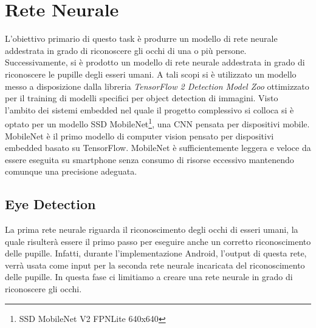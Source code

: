 \documentclass[11pt]{article}
\begin{document}
\newpage

\section{Rete Neurale}
\label{sec:ret}
L’obiettivo primario di questo task è produrre un modello di rete neurale addestrata in grado di riconoscere gli occhi di una o più persone. Successivamente, si è prodotto un modello di rete neurale addestrata in grado di riconoscere le pupille degli esseri umani.
\newline
A tali scopi si è utilizzato un modello messo a disposizione dalla libreria \textit{TensorFlow 2 Detection Model Zoo} ottimizzato per il training di modelli specifici per object detection di immagini. Visto l’ambito dei sistemi embedded nel quale il progetto complessivo si colloca si è optato per un modello SSD MobileNet\footnote{SSD MobileNet V2 FPNLite 640x640}, una CNN pensata per dispositivi mobile. MobileNet è il primo modello di computer vision pensato per dispositivi embedded basato su TensorFlow. MobileNet è sufficientemente leggera e veloce da essere eseguita su smartphone senza consumo di risorse eccessivo mantenendo comunque una precisione adeguata.

\newpage

\subsection{Eye Detection}
\label{sub:eye}
La prima rete neurale riguarda il riconoscimento degli occhi di esseri umani, la quale risulterà essere il primo passo per eseguire anche un corretto riconoscimento delle pupille. Infatti, durante l'implementazione Android, l'output di questa rete, verrà usata come input per la seconda rete neurale incaricata del riconoscimento delle pupille. In questa fase ci limitiamo a creare una rete neurale in grado di riconoscere gli occhi.
\end{document}
